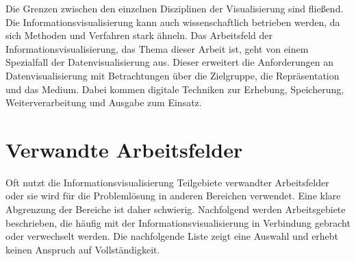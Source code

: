 \documentclass[a4paper, 
               12pt,
               DIV=calc,
               version=first,
               pdftex,
               headsepline,
               footsepline,
               bibliography=totocnumbered,
               listof=numbered]{scrreprt}
\begin{document}
Die Grenzen zwischen den einzelnen Disziplinen der Visualisierung sind fließend. Die Informationsvisualisierung kann
auch wissenschaftlich betrieben werden, da sich Methoden und Verfahren stark ähneln.
Das Arbeitsfeld der Informationsvisualisierung, das Thema dieser Arbeit ist,
geht von einem Spezialfall der Datenvisualisierung aus. Dieser erweitert die Anforderungen an Datenvisualisierung mit
Betrachtungen über die Zielgruppe, die Repräsentation und das Medium. Dabei kommen digitale
Techniken zur Erhebung, Speicherung, Weiterverarbeitung und Ausgabe zum Einsatz.

\section{Verwandte Arbeitsfelder}
\label{sec:Arbeitsfelder}
Oft nutzt die Informationsvisualisierung Teilgebiete verwandter Arbeitsfelder oder sie wird für die Problemlösung
in anderen Bereichen verwendet. Eine klare Abgrenzung der Bereiche ist daher schwierig.
Nachfolgend werden Arbeitsgebiete beschrieben, die häufig mit der Informationsvisualisierung in Verbindung
gebracht oder verwechselt werden. Die nachfolgende Liste zeigt
eine Auswahl und erhebt keinen Anspruch auf Vollständigkeit.
\end{document}
